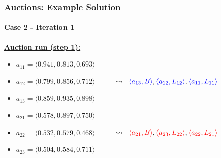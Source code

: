 \begin{frame}
	\frametitle{Auctions: Example Solution}
	\framesubtitle{Case 2 - Iteration 1}
	
	\vspace{0.3cm}
	
	\textbf{\underline{Auction run (step 1):}}
	
	\begin{itemize}
		\item<1-> $ a_{11} = \langle 0.941,0.813,0.693 \rangle $
		\item<1-> $ a_{12} = \langle 0.799,0.856,0.712 \rangle $ $ \;\;\;\;\;\;\;\;\;
					\leadsto \;\; \textcolor{blue}{\langle a_{13},B \rangle}, \textcolor{blue}
					{\langle a_{12},L_{12} \rangle}, \textcolor{blue}{\langle a_{11},L_{11}
					\rangle} $
		\item<1-> $ a_{13} = \langle 0.859,0.935,0.898 \rangle $
		\vspace{0.5cm}
		\item<2-> $ a_{21} = \langle 0.578,0.897,0.750 \rangle $
		\item<2-> $ a_{22} = \langle 0.532,0.579,0.468 \rangle $ $ \;\;\;\;\;\;\;\;\; \leadsto
					\;\; \textcolor{red}{\langle a_{21},B \rangle}, \textcolor{red}{\langle
					a_{23},L_{22} \rangle}, \textcolor{red}{\langle a_{22},L_{21} \rangle} $
		\item<2-> $ a_{23} = \langle 0.504,0.584,0.711 \rangle $
	\end{itemize}
\end{frame}

